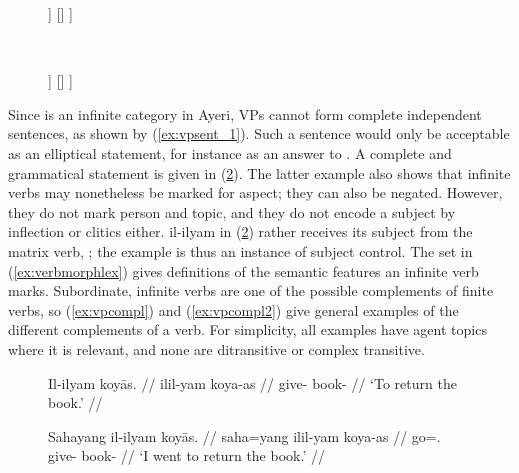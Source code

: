 \begin{figure}
\ex{}\label{ex:vpcstruct}
\begin{minipage}[t]{.5\remaining}
\tl\quad%
\begin{forest}
[\anno{VP}
	[\anno{\xbar{V}}
		[\anno{\xhead{V}}]
		[{\anno[\pass{\GF}]{XP}}]		
	]
	[{}]
]
\end{forest}
\end{minipage}
~
\begin{minipage}[t]{.5\remaining}
\tl\quad%
\begin{forest}
[\anno{VP}
	[\anno{VP}
		[\anno{\xhead{V}}]
		[{\anno[\elem{\Adjc}]{AdvP}}]
	]
	[{}]
]
\end{forest}
\end{minipage}
\xe
\end{figure}

Since  is an infinite category in Ayeri, VPs cannot form complete
independent sentences, as shown by (\ref{ex:vpsent_1}). Such a sentence would
only be acceptable as an elliptical statement, for instance as an answer to
. A complete and
grammatical statement is given in (\ref{ex:vpsent_2}). The latter example also
shows that infinite verbs may nonetheless be marked for aspect; they can also
be negated. However, they do not mark person and topic, and they do not encode
a subject by inflection or clitics either.  {il-ilyam} in
(\ref{ex:vpsent_2}) rather receives its subject from the matrix verb,
; the example is thus an instance of subject
control. The set in (\ref{ex:verbmorphlex}) gives definitions of the
semantic features an infinite verb marks. Subordinate, infinite verbs are
one of the possible complements of finite verbs, so (\ref{ex:vpcompl}) and
(\ref{ex:vpcompl2}) give general examples of the different complements of a
verb. For simplicity, all examples have agent topics where it is relevant, and
none are ditransitive or complex transitive.

\begin{figure}
\pex\label{ex:vpsent}
\a\label{ex:vpsent_1}\ljudge*\begingl
	\gla Il-ilyam koyās. //
	\glb il\til{}il-yam koya-as //
	\glc \Iter{}\til{}give-\Ptcp{} book-\Parg{} //
	\glft `To return the book.' //
\endgl

\a\label{ex:vpsent_2}\begingl
	\gla Sahayang il-ilyam koyās. //
	\glb saha=yang il\til{}il-yam koya-as //
	\glc go=\Fsg{}.\Aarg{} \Iter{}\til{}give-\Ptcp{} book-\Parg{} //
	\glft `I went to return the book.' //
\endgl
\xe
\end{figure}

